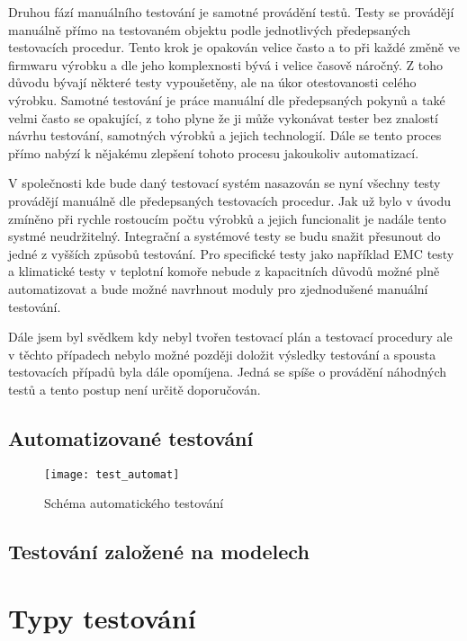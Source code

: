Druhou fází manuálního testování je samotné provádění testů. Testy se provádějí manuálně přímo na testovaném objektu podle jednotlivých předepsaných testovacích procedur. Tento krok je opakován velice často a to při každé změně ve firmwaru výrobku a dle jeho komplexnosti bývá i velice časově náročný. Z toho důvodu bývají některé testy vypoušetěny, ale na úkor otestovanosti celého výrobku. Samotné testování je práce manuální dle předepsaných pokynů a také velmi často se opakující, z toho plyne že ji může vykonávat tester bez znalostí návrhu testování, samotných výrobků a jejich technologií. Dále se tento proces přímo nabýzí k nějakému zlepšení tohoto procesu jakoukoliv automatizací.

V společnosti kde bude daný testovací systém nasazován se nyní všechny testy provádějí manuálně dle předepsaných testovacích procedur. Jak už bylo v úvodu zmíněno při rychle rostoucím počtu výrobků a jejich funcionalit je nadále tento systmé neudržitelný. Integrační a systémové testy se budu snažit přesunout do jedné z vyšších způsobů testování. Pro specifické testy jako například EMC testy a klimatické testy v teplotní komoře nebude z kapacitních důvodů možné plně automatizovat a bude možné navrhnout moduly pro zjednodušené manuální testování.

Dále jsem byl svědkem kdy nebyl tvořen testovací plán a testovací procedury  ale v těchto případech nebylo možné později doložit výsledky testování a spousta testovacích případů byla dále opomíjena. Jedná se spíše o provádění náhodných testů a tento postup není určitě doporučován.

\subsection{Automatizované testování}



\begin{figure}[h]
  \centering
  \texttt{[image: test\_automat]}
  \caption{Schéma automatického testování}
  \label{fig:test_automat}
\end{figure}


\subsection{Testování založené na modelech}


\section{Typy testování}

